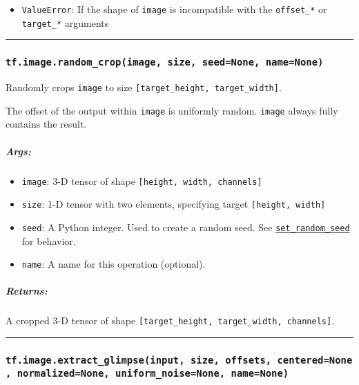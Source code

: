 \begin{itemize}
\tightlist
\item
  \texttt{ValueError}: If the shape of \texttt{image} is incompatible
  with the \texttt{offset\_*} or \texttt{target\_*} arguments
\end{itemize}

\begin{center}\rule{0.5\linewidth}{\linethickness}\end{center}

\subsubsection{\texorpdfstring{\texttt{tf.image.random\_crop(image,\ size,\ seed=None,\ name=None)}
}{tf.image.random\_crop(image, size, seed=None, name=None) }}\label{tf.image.randomux5fcropimage-size-seednone-namenone}

Randomly crops \texttt{image} to size
\texttt{{[}target\_height,\ target\_width{]}}.

The offset of the output within \texttt{image} is uniformly random.
\texttt{image} always fully contains the result.

\subparagraph{Args: }\label{args-12}

\begin{itemize}
\tightlist
\item
  \texttt{image}: 3-D tensor of shape
  \texttt{{[}height,\ width,\ channels{]}}
\item
  \texttt{size}: 1-D tensor with two elements, specifying target
  \texttt{{[}height,\ width{]}}
\item
  \texttt{seed}: A Python integer. Used to create a random seed. See
  \href{../../api_docs/python/constant_op.md\#set_random_seed}{\texttt{set\_random\_seed}}
  for behavior.
\item
  \texttt{name}: A name for this operation (optional).
\end{itemize}

\subparagraph{Returns: }\label{returns-12}

A cropped 3-D tensor of shape
\texttt{{[}target\_height,\ target\_width,\ channels{]}}.

\begin{center}\rule{0.5\linewidth}{\linethickness}\end{center}

\subsubsection{\texorpdfstring{\texttt{tf.image.extract\_glimpse(input,\ size,\ offsets,\ centered=None,\ normalized=None,\ uniform\_noise=None,\ name=None)}
}{tf.image.extract\_glimpse(input, size, offsets, centered=None, normalized=None, uniform\_noise=None, name=None) }}\label{tf.image.extractux5fglimpseinput-size-offsets-centerednone-normalizednone-uniformux5fnoisenone-namenone}

